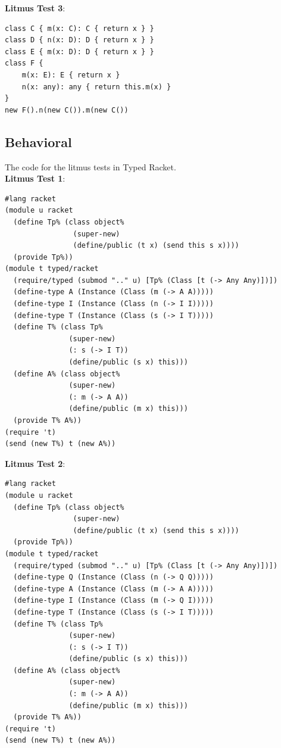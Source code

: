 \documentclass[runnningheads]{tex/llncs}
\begin{document}
\noindent\textbf{Litmus Test 3}:
\begin{verbatim}
class C { m(x: C): C { return x } }
class D { n(x: D): D { return x } }
class E { m(x: D): D { return x } }
class F {
    m(x: E): E { return x }
    n(x: any): any { return this.m(x) }
}
new F().n(new C()).m(new C())
\end{verbatim}

\subsection*{Behavioral}

The code for the litmus tests in Typed Racket. \\

\noindent\textbf{Litmus Test 1}:

\begin{verbatim}
#lang racket
(module u racket
  (define Tp% (class object%
                (super-new)
                (define/public (t x) (send this s x))))
  (provide Tp%))
(module t typed/racket
  (require/typed (submod ".." u) [Tp% (Class [t (-> Any Any)])])
  (define-type A (Instance (Class (m (-> A A)))))
  (define-type I (Instance (Class (n (-> I I)))))
  (define-type T (Instance (Class (s (-> I T)))))
  (define T% (class Tp%
               (super-new)
               (: s (-> I T))
               (define/public (s x) this)))
  (define A% (class object%
               (super-new)
               (: m (-> A A))
               (define/public (m x) this)))
  (provide T% A%))
(require 't)
(send (new T%) t (new A%))
\end{verbatim}

\noindent\textbf{Litmus Test 2}:

\begin{verbatim}
#lang racket
(module u racket
  (define Tp% (class object%
                (super-new)
                (define/public (t x) (send this s x))))
  (provide Tp%))
(module t typed/racket
  (require/typed (submod ".." u) [Tp% (Class [t (-> Any Any)])])
  (define-type Q (Instance (Class (n (-> Q Q)))))
  (define-type A (Instance (Class (m (-> A A)))))
  (define-type I (Instance (Class (m (-> Q I)))))
  (define-type T (Instance (Class (s (-> I T)))))
  (define T% (class Tp%
               (super-new)
               (: s (-> I T))
               (define/public (s x) this)))
  (define A% (class object%
               (super-new)
               (: m (-> A A))
               (define/public (m x) this)))
  (provide T% A%))
(require 't)
(send (new T%) t (new A%))
\end{verbatim}
\end{document}
